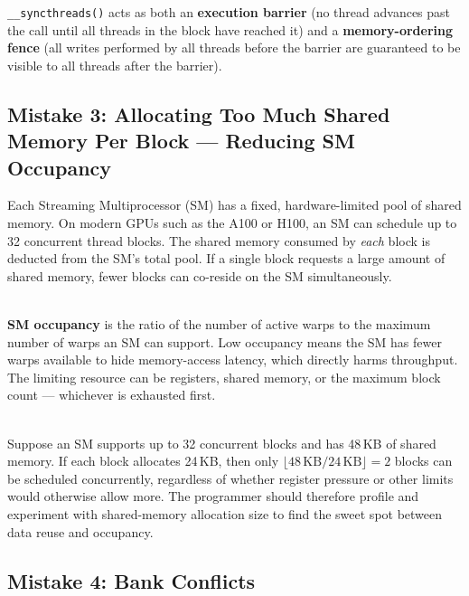\texttt{\_\_syncthreads()} acts as both an \textbf{execution barrier} (no
thread advances past the call until all threads in the block have reached it)
and a \textbf{memory-ordering fence} (all writes performed by all threads
before the barrier are guaranteed to be visible to all threads after the
barrier).

\subsection{Mistake 3: Allocating Too Much Shared Memory Per Block ---
Reducing SM Occupancy}
\label{subsec:sm-occupancy}

Each Streaming Multiprocessor (SM) has a fixed, hardware-limited pool of
shared memory. On modern GPUs such as the A100 or H100, an SM can schedule up
to 32 concurrent thread blocks. The shared memory consumed by \emph{each} block
is deducted from the SM's total pool. If a single block requests a large amount
of shared memory, fewer blocks can co-reside on the SM simultaneously.

\begin{ppkey}
  \\\textbf{SM occupancy} is the ratio of the number of active warps to the
  maximum number of warps an SM can support. Low occupancy means the SM has
  fewer warps available to hide memory-access latency, which directly harms
  throughput. The limiting resource can be registers, shared memory, or the
  maximum block count --- whichever is exhausted first.
\end{ppkey}

\begin{ppexample}
  \\Suppose an SM supports up to 32 concurrent
  blocks and has 48\,KB of shared memory. If each block allocates 24\,KB, then
  only $\lfloor 48\,\text{KB} / 24\,\text{KB} \rfloor = 2$ blocks can be
  scheduled concurrently, regardless of whether register pressure or other limits
  would otherwise allow more. The programmer should therefore profile and
  experiment with shared-memory allocation size to find the sweet spot between
  data reuse and occupancy.
\end{ppexample}

\subsection{Mistake 4: Bank Conflicts}
\label{subsec:bank-conflicts}

